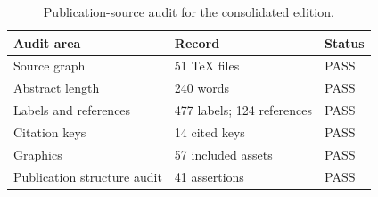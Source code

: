 \begin{table}[htbp]
\centering
\small
\caption{Publication-source audit for the consolidated edition.}
\label{tab:block14-publication-audit}
\begin{tabularx}{\textwidth}{@{}L{0.27\textwidth}YL{0.12\textwidth}@{}}
\toprule
Audit area & Record & Status \\
\midrule
Source graph & 51 TeX files & PASS \\
Abstract length & 240 words & PASS \\
Labels and references & 477 labels; 124 references & PASS \\
Citation keys & 14 cited keys & PASS \\
Graphics & 57 included assets & PASS \\
Publication structure audit & 41 assertions & PASS \\
\bottomrule
\end{tabularx}
\end{table}
